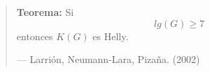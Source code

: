 \documentclass[beamer]{standalone}
\begin{document}
\begin{standaloneframe}
  \begin{quote}
    \textbf{Teorema:}
    Si
    \begin{equation*}
      lg(G)\geq 7
    \end{equation*}
    entonces $K(G)$ es Helly.

    --- \color{purple} Larrión, Neumann-Lara, Pizaña. (2002)
  \end{quote}
\end{standaloneframe}
\end{document}
